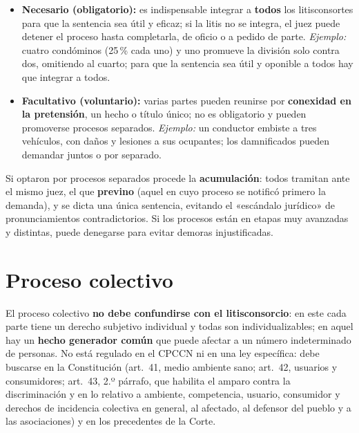\documentclass[12pt,oneside]{book}
\begin{document}
\begin{itemize}
\item \textbf{Necesario (obligatorio):} es indispensable integrar a \textbf{todos} los litisconsortes para que la sentencia sea útil y eficaz; si la litis no se integra, el juez puede detener el proceso hasta completarla, de oficio o a pedido de parte. \textit{Ejemplo:} cuatro condóminos (25\,\% cada uno) y uno promueve la división solo contra dos, omitiendo al cuarto; para que la sentencia sea útil y oponible a todos hay que integrar a todos.
\item \textbf{Facultativo (voluntario):} varias partes pueden reunirse por \textbf{conexidad en la pretensión}, un hecho o título único; no es obligatorio y pueden promoverse procesos separados. \textit{Ejemplo:} un conductor embiste a tres vehículos, con daños y lesiones a sus ocupantes; los damnificados pueden demandar juntos o por separado.
\end{itemize}

Si optaron por procesos separados procede la \textbf{acumulación}: todos tramitan ante el mismo juez, el que \textbf{previno} (aquel en cuyo proceso se notificó primero la demanda), y se dicta una única sentencia, evitando el «escándalo jurídico» de pronunciamientos contradictorios. Si los procesos están en etapas muy avanzadas y distintas, puede denegarse para evitar demoras injustificadas.

\section{Proceso colectivo}

El proceso colectivo \textbf{no debe confundirse con el litisconsorcio}: en este cada parte tiene un derecho subjetivo individual y todas son individualizables; en aquel hay un \textbf{hecho generador común} que puede afectar a un número indeterminado de personas. No está regulado en el CPCCN ni en una ley específica: debe buscarse en la Constitución (art.~41, medio ambiente sano; art.~42, usuarios y consumidores; art.~43, 2.º párrafo, que habilita el amparo contra la discriminación y en lo relativo a ambiente, competencia, usuario, consumidor y derechos de incidencia colectiva en general, al afectado, al defensor del pueblo y a las asociaciones) y en los precedentes de la Corte.
\end{document}
